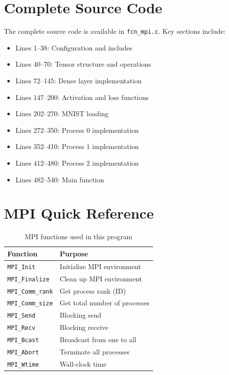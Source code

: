 \documentclass[11pt,a4paper]{article}
\begin{document}
\appendix

\section{Complete Source Code}

The complete source code is available in \texttt{fcn\_mpi.c}. Key sections include:

\begin{itemize}
    \item Lines 1--38: Configuration and includes
    \item Lines 40--70: Tensor structure and operations
    \item Lines 72--145: Dense layer implementation
    \item Lines 147--200: Activation and loss functions
    \item Lines 202--270: MNIST loading
    \item Lines 272--350: Process 0 implementation
    \item Lines 352--410: Process 1 implementation
    \item Lines 412--480: Process 2 implementation
    \item Lines 482--540: Main function
\end{itemize}

\section{MPI Quick Reference}

\begin{table}[h]
\centering
\begin{tabular}{@{}ll@{}}
\toprule
\textbf{Function} & \textbf{Purpose} \\
\midrule
\texttt{MPI\_Init} & Initialize MPI environment \\
\texttt{MPI\_Finalize} & Clean up MPI environment \\
\texttt{MPI\_Comm\_rank} & Get process rank (ID) \\
\texttt{MPI\_Comm\_size} & Get total number of processes \\
\texttt{MPI\_Send} & Blocking send \\
\texttt{MPI\_Recv} & Blocking receive \\
\texttt{MPI\_Bcast} & Broadcast from one to all \\
\texttt{MPI\_Abort} & Terminate all processes \\
\texttt{MPI\_Wtime} & Wall-clock time \\
\bottomrule
\end{tabular}
\caption{MPI functions used in this program}
\end{table}

\end{document}
